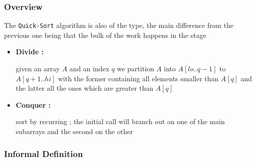\subsubsection{Overview}

	\par{The \texttt{Quick-Sort} algorithm is also of the
			 type, the main difference from the previous
			one being that the bulk of the work happens in the 
	stage}


	\begin{itemize}
			\item\textbf{Divide : }\par{ given an array $A$ and an index $q$
							we partition $A$ into $A[lo..q-1]$ to $A[q+1..hi]$
							with the former containing all elements smaller than
							$A[q]$ and the latter all the ones which are greater
					than $A[q]$}
			\item\textbf{Conquer :}\par{sort by recurring ; the initial call
							will branch out on one of the main subarrays and the
					second on the other}

	\end{itemize}


\subsubsection{Informal Definition}

